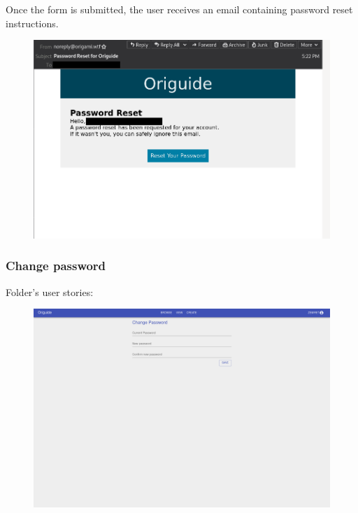 Once the form is submitted, the user receives an email containing password reset instructions.

\begin{figure}[H]
  	\centering
    \includegraphics[width=\textwidth]{assets/5-passwordResetEmail.png}
\end{figure}

\subsubsection{Change password}

Folder's user stories:
\begin{enumerate}
	\setcounter{enumi}{18}
\end{enumerate}

\begin{figure}[H]
  	\centering
    \includegraphics[width=\textwidth]{assets/5-passwordChange.png}
\end{figure}

